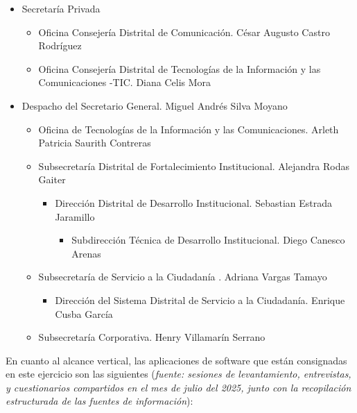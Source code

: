 \documentclass[
	a4paper, %
	12pt, %
]{include/CSSullivanBusinessReport}
\def\tightlist{}
\begin{document}
\begin{itemize}
\tightlist
\item
  Secretaría Privada

  \begin{itemize}
  \tightlist
  \item
    Oficina Consejería Distrital de Comunicación. César Augusto Castro
    Rodríguez
  \item
    Oficina Consejería Distrital de Tecnologías de la Información y las
    Comunicaciones -TIC. Diana Celis Mora
  \end{itemize}
\item
  Despacho del Secretario General. Miguel Andrés Silva Moyano

  \begin{itemize}
  \tightlist
  \item
    Oficina de Tecnologías de la Información y las Comunicaciones.
    Arleth Patricia Saurith Contreras
  \item
    Subsecretaría Distrital de Fortalecimiento Institucional. Alejandra
    Rodas Gaiter

    \begin{itemize}
    \tightlist
    \item
      Dirección Distrital de Desarrollo Institucional. Sebastian Estrada
      Jaramillo

      \begin{itemize}
      \tightlist
      \item
        Subdirección Técnica de Desarrollo Institucional. Diego Canesco
        Arenas
      \end{itemize}
    \end{itemize}
  \item
    Subsecretaría de Servicio a la Ciudadanía . Adriana Vargas Tamayo

    \begin{itemize}
    \tightlist
    \item
      Dirección del Sistema Distrital de Servicio a la Ciudadanía.
      Enrique Cusba García
    \end{itemize}
  \item
    Subsecretaría Corporativa. Henry Villamarín Serrano
  \end{itemize}
\end{itemize}

En cuanto al alcance vertical, las aplicaciones de software que están
consignadas en este ejercicio son las siguientes (\emph{fuente: sesiones
de levantamiento, entrevistas, y cuestionarios compartidos en el mes de
julio del 2025, junto con la recopilación estructurada de las fuentes de
información}):
\end{document}

